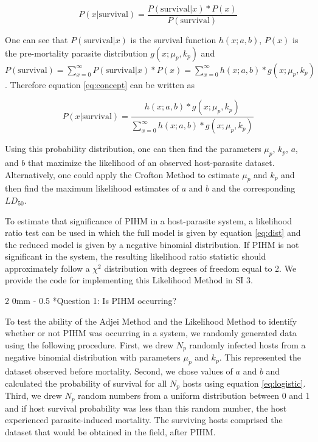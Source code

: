 \documentclass[12pt, a4paper]{article}
\makeatletter
\renewcommand{\subsection}{\@startsection
{subsection}%
{2}%
{0mm}%
{-\baselineskip}%
{0.5\baselineskip}%
{\normalfont\bf}} %
\makeatother
\begin{document}
\begin{equation}
    P(x | \text{survival}) = \dfrac{P(\text{survival} | x) * P(x)}{P(\text{survival})}
    \label{eq:concept}
\end{equation}

One can see that $P(\text{survival} | x)$ is the survival function $h(x; a, b)$, $P(x)$ is the pre-mortality parasite distribution $g(x; \mu_p, k_p)$ and $P(\text{survival}) = \sum_{x=0}^{\infty} P(\text{survival} | x) * P(x) =  \sum_{x=0}^{\infty} h(x; a, b)  * g(x; \mu_p, k_p)$. Therefore equation \ref{eq:concept} can be written as

\begin{equation}
    P(x | \text{survival}) = \dfrac{h(x; a, b)  * g(x; \mu_p, k_p)}{\sum_{x=0}^{\infty} h(x; a, b)  * g(x; \mu_p, k_p)}
    \label{eq:dist}
\end{equation}

Using this probability distribution, one can then find the parameters $\mu_p$, $k_p$, $a$, and $b$ that maximize the likelihood of an observed host-parasite dataset. Alternatively, one could apply the Crofton Method to estimate $\mu_p$ and $k_p$ and then find the maximum likelihood estimates of $a$ and $b$ and the corresponding $LD_{50}$.

To estimate that significance of PIHM in a host-parasite system, a
likelihood ratio test can be used in which the full model is given by equation
\ref{eq:dist} and the reduced model is given by a negative binomial
distribution.  If PIHM is not significant in the system, the resulting likelihood
ratio statistic should approximately follow a $\chi^2$ distribution with degrees of freedom equal to 2.  We provide the code for implementing this Likelihood Method in SI 3.

\subsection*{Question 1: Is PIHM occurring?}

To test the ability of the Adjei Method and the Likelihood Method to identify whether or not PIHM was occurring in a system, we randomly generated data using the following procedure.  First, we drew $N_p$ randomly infected hosts from a
negative binomial distribution with parameters $\mu_p$ and $k_p$.  This represented the dataset observed before mortality. Second, we chose values of $a$ and $b$ and calculated the probability of survival
for all $N_p$ hosts using equation \ref{eq:logistic}.  Third, we drew $N_p$ random numbers from a uniform distribution
between 0 and 1 and if host survival probability was less than this random
number, the host experienced parasite-induced mortality.  The surviving
hosts comprised the dataset that would be obtained in the field, after PIHM.
\end{document}
